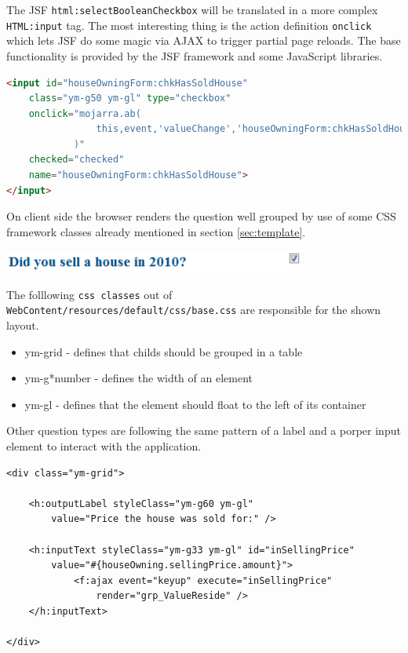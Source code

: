 The JSF \texttt{html:selectBooleanCheckbox} will be translated in a more complex
\texttt{HTML:input} tag. The most interesting thing is the action definition
\texttt{onclick} which lets JSF do some magic via AJAX to trigger partial page
reloads. The base functionality is provided by the JSF framework and some
JavaScript libraries.

\begin{lstlisting}[language=HTML]
<input id="houseOwningForm:chkHasSoldHouse" 
	class="ym-g50 ym-gl" type="checkbox"
	onclick="mojarra.ab(
				this,event,'valueChange','houseOwningForm:chkHasSoldHouse','houseOwningForm:grp_hasSoldHouse_hasBoughtHouse'
			)"
	checked="checked" 
	name="houseOwningForm:chkHasSoldHouse">
</input>
\end{lstlisting}
    
On client side the browser renders the question well grouped by use of some CSS
framework classes already mentioned in section \ref{sec:template}. 

\begin{center}
 \includegraphics[width=10cm]{./images/chapter02/referenceimpl_forms_bool.png}
\end{center}

The folllowing \texttt{css classes} out of
\texttt{WebContent/resources/default/css/base.css} are responsible for the shown
layout.

\begin{itemize}
  \item ym-grid - defines that childs should be grouped in a table
  \item ym-g*number - defines the width of an element
  \item ym-gl - defines that the element should float to the left of its
  container
\end{itemize}

Other question types are following the same pattern of a label and a porper
input element to interact with the application.

\begin{lstlisting}[language=XHTML]
<div class="ym-grid">

	<h:outputLabel styleClass="ym-g60 ym-gl"
		value="Price the house was sold for:" />

	<h:inputText styleClass="ym-g33 ym-gl" id="inSellingPrice"
		value="#{houseOwning.sellingPrice.amount}">
			<f:ajax event="keyup" execute="inSellingPrice"
				render="grp_ValueReside" />
	</h:inputText>

</div>
\end{lstlisting}

